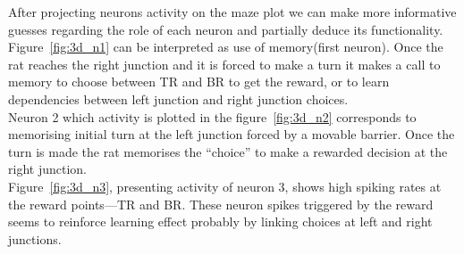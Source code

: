\documentclass[11pt,a4paper,twocolumn]{article}
\begin{document}
After projecting neurons activity on the maze plot we can make more informative guesses regarding the role of each neuron and partially deduce its functionality.\\

Figure~\ref{fig:3d_n1} can be interpreted as use of memory(first neuron). Once the rat reaches the right junction and it is forced to make a turn it makes a call to memory to choose between TR and BR to get the reward, or to learn dependencies between left junction and right junction choices.\\

Neuron 2 which activity is plotted in the figure~\ref{fig:3d_n2} corresponds to memorising initial turn at the left junction forced by a movable barrier. Once the turn is made the rat memorises the ``choice'' to make a rewarded decision at the right junction.\\

Figure~\ref{fig:3d_n3}, presenting activity of neuron 3, shows high spiking rates at the reward points---TR and BR. These neuron spikes triggered by the reward seems to reinforce learning effect probably by linking choices at left and right junctions.\\
\end{document}
